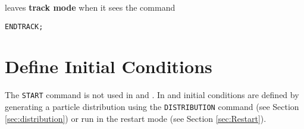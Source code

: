 \opal leaves \textbf{track mode} when it sees the command
\begin{verbatim}
ENDTRACK;
\end{verbatim}



\section{Define Initial Conditions}
\label{sec:trackstart}
The \texttt{START} command is not used in \noopalt and \noopalcycl . In 
\opalt and \opalcycl initial conditions are defined by generating a particle
distribution using the \texttt{DISTRIBUTION} command (see Section \ref{sec:distribution}) or
run \opal in the restart mode (see Section \ref{sec:Restart}). 

